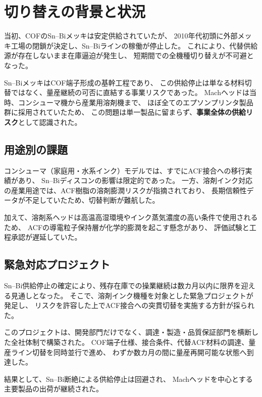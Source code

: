 \documentclass[conference]{IEEEtran}
\begin{document}
\section{切り替えの背景と状況}

当初、COFのSn–Biメッキは安定供給されていたが、  
2010年代初頭に外部メッキ工場の閉鎖が決定し、Sn–Biラインの稼働が停止した。  
これにより、代替供給源が存在しないまま在庫逼迫が発生し、  
短期間での全機種切り替えが不可避となった。  

Sn–BiメッキはCOF端子形成の基幹工程であり、  
この供給停止は単なる材料切替ではなく、量産継続の可否に直結する事業リスクであった。  
Machヘッドは当時、コンシューマ機から産業用溶剤機まで、  
ほぼ全てのエプソンプリンタ製品群に採用されていたため、  
この問題は単一製品に留まらず、\textbf{事業全体の供給リスク}として認識された。  

\subsection{用途別の課題}
コンシューマ（家庭用・水系インク）モデルでは、すでにACF接合への移行実績があり、  
Sn–Biディスコンの影響は限定的であった。  
一方、溶剤インク対応の産業用途では、ACF樹脂の溶剤膨潤リスクが指摘されており、  
長期信頼性データが不足していたため、切替判断が難航した。  

加えて、溶剤系ヘッドは高温高湿環境やインク蒸気濃度の高い条件で使用されるため、  
ACFの導電粒子保持層が化学的膨潤を起こす懸念があり、  
評価試験と工程承認が遅延していた。

\subsection{緊急対応プロジェクト}
Sn–Bi供給停止の確定により、残存在庫での操業継続は数カ月以内に限界を迎える見通しとなった。  
そこで、溶剤インク機種を対象とした緊急プロジェクトが発足し、  
リスクを許容した上でACF接合への突貫切替を実施する方針が採られた。  

このプロジェクトは、開発部門だけでなく、調達・製造・品質保証部門を横断した全社体制で構築された。  
COF端子仕様、接合条件、代替ACF材料の調達、量産ライン切替を同時並行で進め、  
わずか数カ月の間に量産再開可能な状態へ到達した。  

結果として、Sn–Bi断絶による供給停止は回避され、  
Machヘッドを中心とする主要製品の出荷が継続された。
\end{document}
